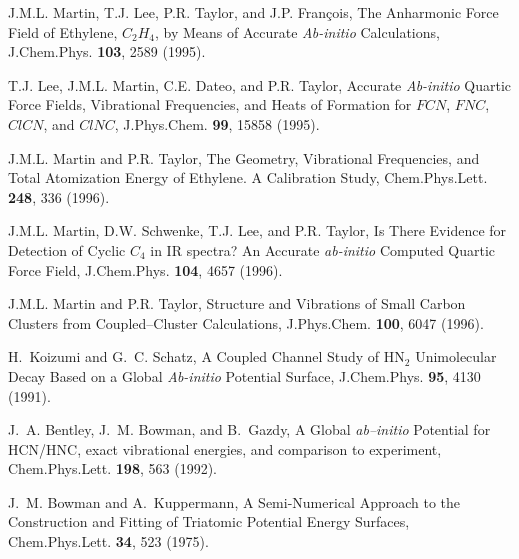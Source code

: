 \begin{thebibliography}{999}
J.M.L. Martin, T.J. Lee, P.R. Taylor,
and J.P. Fran\c{c}ois,
The Anharmonic Force Field of Ethylene, $C_2H_4$, by Means of
Accurate {\it Ab-initio} Calculations,
J.Chem.Phys. {\bf 103}, 2589 (1995).

T.J. Lee,
J.M.L. Martin, C.E. Dateo, and P.R. Taylor,
Accurate {\it Ab-initio} Quartic Force Fields,
Vibrational Frequencies, and Heats of Formation
for $FCN$, $FNC$, $ClCN$, and $ClNC$,
J.Phys.Chem. {\bf 99}, 15858 (1995).

J.M.L. Martin and P.R. Taylor,
The Geometry, Vibrational Frequencies, and Total Atomization
Energy of Ethylene. A Calibration Study,
Chem.Phys.Lett. {\bf 248}, 336 (1996).

J.M.L. Martin, D.W. Schwenke, T.J. Lee, and P.R. Taylor,
Is There Evidence for Detection of Cyclic $C_4$ in IR spectra?
An Accurate {\it ab-initio} Computed Quartic Force Field,
J.Chem.Phys. {\bf 104}, 4657 (1996).

J.M.L. Martin and P.R. Taylor,
Structure and Vibrations of Small Carbon Clusters from 
Coupled--Cluster Calculations,
J.Phys.Chem. {\bf 100}, 6047 (1996).






H.~Koizumi and G.~C. Schatz,
A Coupled Channel Study of HN$_2$ Unimolecular Decay Based on a
Global {\it Ab-initio} Potential Surface,
\newblock J.Chem.Phys. {\bf 95}, 4130 (1991).

J.~A. Bentley, J.~M. Bowman, and B.~Gazdy,
A Global {\it ab--initio} Potential for HCN/HNC,
exact vibrational energies, and comparison to experiment,
\newblock Chem.Phys.Lett. {\bf 198}, 563 (1992).

J.~M. Bowman and A.~Kuppermann,
A Semi-Numerical Approach to the Construction and Fitting of Triatomic 
Potential Energy Surfaces,
\newblock Chem.Phys.Lett. {\bf 34}, 523 (1975).


\end{thebibliography}
